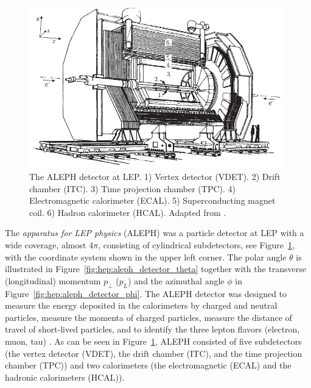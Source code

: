 \begin{figure}
  \centerfloat
  \includegraphics[width=0.99\textwidth]{figures/ALEPH/aleph.pdf}
  \caption[The ALEPH Detector]{The ALEPH detector at LEP. 1) Vertex detector (VDET). 2) Drift chamber (ITC). 3) Time projection chamber (TPC). 4) Electromagnetic calorimeter (ECAL). 5) Superconducting magnet coil. 6) Hadron calorimeter (HCAL). Adapted from \citet{buskulicInvestigationBd0Bs01994}.}
  \label{fig:hep:aleph_detector}
\end{figure}

The \emph{apparatus for LEP physics} (ALEPH) was a particle detector at LEP with a wide coverage, almost $4 \pi$, consisting of cylindrical subdetectors, see Figure~\ref{fig:hep:aleph_detector}, with the coordinate system shown in the upper left corner. The polar angle $\theta$ is illustrated in Figure~\ref{fig:hep:aleph_detector_theta} together with the transverse (longitudinal) momentum $p_\perp$ ($p_L$) and the azimuthal angle $\phi$ in Figure~\ref{fig:hep:aleph_detector_phi}. The ALEPH detector was designed to measure the energy deposited in the calorimeters by charged and neutral particles, measure the momenta of charged particles, measure the distance of travel of short-lived particles, and to identify the three lepton flavors (electron, muon, tau) \autocite{buskulicInvestigationBd0Bs01994}. As can be seen in Figure~\ref{fig:hep:aleph_detector}, ALEPH consisted of five subdetectors (the vertex detector (VDET), the drift chamber (ITC), and the time projection chamber (TPC)) and two calorimeters (the electromagnetic (ECAL) and the hadronic calorimeters (HCAL)). 

